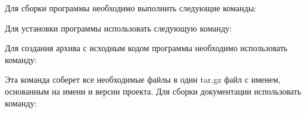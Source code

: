 Для сборки программы необходимо выполнить следующие команды\+: 
\begin{DoxyCode}{0}

\end{DoxyCode}
 Для установки программы использовать следующую команду\+: 
\begin{DoxyCode}{0}

\end{DoxyCode}
 Для создания архива с исходным кодом программы необходимо использовать команду\+: 
\begin{DoxyCode}{0}

\end{DoxyCode}
 Эта команда соберет все необходимые файлы в один tar.\+gz файл с именем, основанным на имени и версии проекта. Для сборки документации использовать команду\+: 
\begin{DoxyCode}{0}

\end{DoxyCode}
 